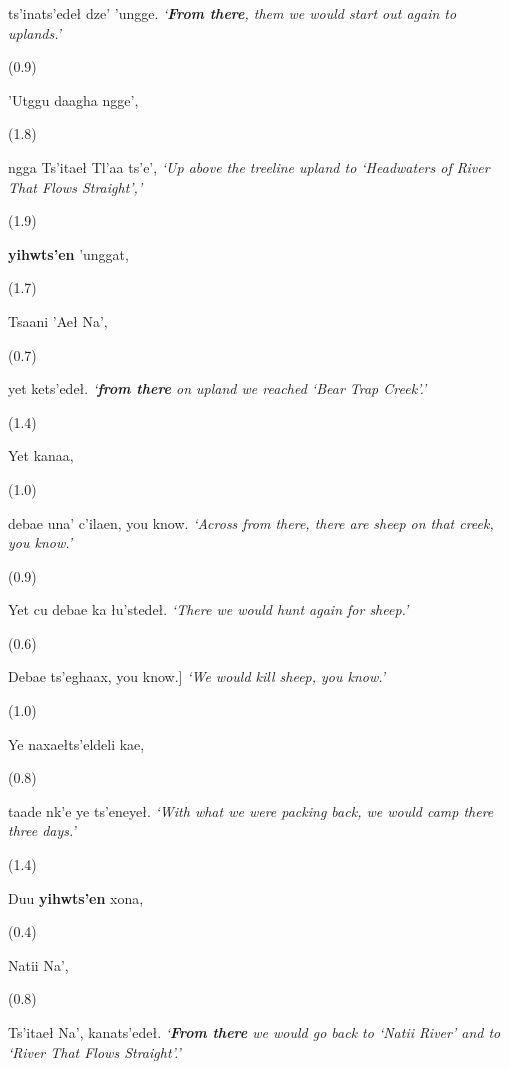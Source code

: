 \begin{exe}
\begin{xlist}
   			ts’inats’edeł dze’ ’ungge.
	\glt	\textit{‘\textbf{From there}, them we would start out again to uplands.’}
\sn \begin{flushright}(0.9)\end{flushright}
 		’Utggu daagha ngge’,
\sn \begin{flushright}(1.8)\end{flushright}
   			ngga Ts’itaeł Tl'aa ts’e’,
\glt	\textit{‘Up above the treeline upland to ‘Headwaters of River That Flows Straight’,’}
\sn \begin{flushright}(1.9)\end{flushright}
  			\textbf{yihwts’en} ’unggat,
\sn \begin{flushright}(1.7)\end{flushright}
   			Tsaani ’Aeł Na’,
\sn \begin{flushright}(0.7)\end{flushright}
   			yet kets’edeł.
		\glt \textit{‘\textbf{from there} on upland we reached ‘Bear Trap Creek’.’}
\sn \begin{flushright}(1.4)\end{flushright}
 			Yet kanaa,
\sn \begin{flushright}(1.0)\end{flushright}
   			debae una’ c’ilaen,
   			you know.
		\glt	\textit{‘Across from there, there are sheep on that creek, you know.’}
\sn \begin{flushright}(0.9)\end{flushright}
   			Yet cu debae ka łu’stedeł.
	\glt	\textit{	‘There we would hunt again for sheep.’}
\sn \begin{flushright}(0.6)\end{flushright}
   			Debae ts’eghaax,
   			you know.]
		\glt	\textit{‘We would kill sheep, you know.’}
\sn \begin{flushright}(1.0)\end{flushright}
   			Ye naxaełts’eldeli kae,
\sn \begin{flushright}(0.8)\end{flushright}
   			taade nk’e ye ts’eneyeł.
\glt	\textit{‘With what we were packing back, we would camp there three days.’}
\sn \begin{flushright}(1.4)\end{flushright}
   			Duu \textbf{yihwts’en} xona,
\sn \begin{flushright}(0.4)\end{flushright}
   			Natii Na’,
\sn \begin{flushright}(0.8)\end{flushright}
   			Ts’itaeł Na’,
   			kanats’edeł.
\glt \textit{‘\textbf{From there} we would go back to ‘Natii River’ and to ‘River That Flows Straight’.’}


\end{xlist}
\end{exe}

